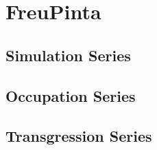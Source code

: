 \hypertarget{chapter8}{}
\chapter{FreuPinta}

\section{Simulation Series}
\section{Occupation Series}
\section{Transgression Series}

\label{ch:freupinta}
